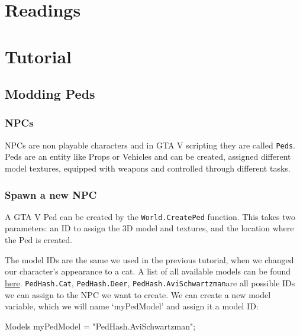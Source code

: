 \documentclass[
  openany]{book}
\newenvironment{Shaded}{\begin{snugshade}}{\end{snugshade}}
\newcommand{\NormalTok}[1]{#1}
\newcommand{\StringTok}[1]{\textcolor[rgb]{0.31,0.60,0.02}{#1}}
\begin{document}
\hypertarget{readings-4}{%
\section*{Readings}\label{readings-4}}

\hypertarget{tutorial-4}{%
\section*{Tutorial}\label{tutorial-4}}

\hypertarget{modding-peds}{%
\subsection*{Modding Peds}\label{modding-peds}}

\hypertarget{npcs}{%
\subsubsection*{NPCs}\label{npcs}}

NPCs are non playable characters and in GTA V scripting they are called \texttt{Peds}. Peds are an entity like Props or Vehicles and can be created, assigned different model textures, equipped with weapons and controlled through different tasks.

\hypertarget{spawn-a-new-npc}{%
\subsubsection*{Spawn a new NPC}\label{spawn-a-new-npc}}

A GTA V Ped can be created by the \texttt{World.CreatePed} function. This takes two parameters: an ID to assign the 3D model and textures, and the location where the Ped is created.

The model IDs are the same we used in the previous tutorial, when we changed our character's appearance to a cat. A list of all available models can be found \href{https://wiki.gtanet.work/index.php/Peds}{here}. \texttt{PedHash.Cat}, \texttt{PedHash.Deer}, \texttt{PedHash.AviSchwartzman}are all possible IDs we can assign to the NPC we want to create.
We can create a new model variable, which we will name `myPedModel' and assign it a model ID:

\begin{Shaded}
\begin{Highlighting}[]
\NormalTok{Models myPedModel = }\StringTok{"PedHash.AviSchwartzman"}\NormalTok{;}
\end{Highlighting}
\end{Shaded}
\end{document}
